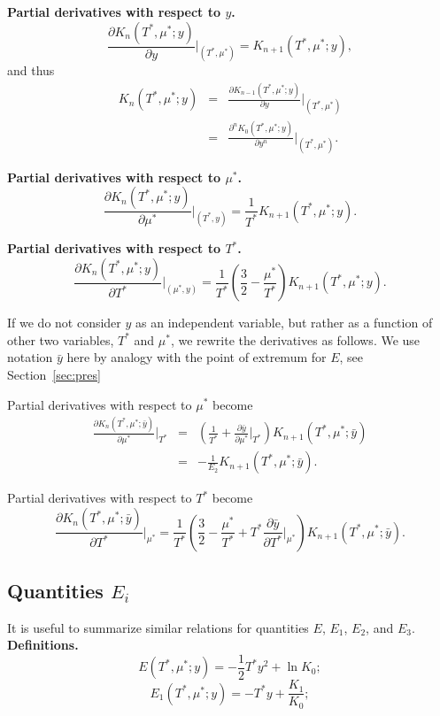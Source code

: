 \documentclass[12pt]{article}
\numberwithin{equation}{section}
\begin{document}
	\textbf{Partial derivatives with respect to $y$.} 
	\begin{equation}
		\frac{\partial K_n(T^*,\mu^*;y)}{\partial y}\bigg|_{(T^*,\mu^*)} = K_{n+1}(T^*,\mu^*;y),
	\end{equation}
	and thus
	\begin{eqnarray}
		K_n(T^*,\mu^*;y) & = & \frac{\partial K_{n-1}(T^*,\mu^*;y)}{\partial y} \bigg|_{(T^*,\mu^*)}
		\nonumber\\
		& = & \frac{\partial^n K_{0}(T^*,\mu^*;y)}{\partial y^n} \bigg|_{(T^*,\mu^*)}.
	\end{eqnarray}
	
	\textbf{Partial derivatives with respect to $\mu^*$.}
	\begin{equation}
		\frac{\partial K_n(T^*,\mu^*;y)}{\partial \mu^*} \bigg|_{(T^*,y)} = \frac{1}{T^*} K_{n+1}(T^*,\mu^*;y).
	\end{equation}
	
	\textbf{Partial derivatives with respect to $T^*$.}
	\begin{equation}
		\frac{\partial K_n(T^*,\mu^*;y)}{\partial T^*} \bigg|_{(\mu^*,y)} = \frac{1}{T^*} \left(\frac{3}{2} - \frac{\mu^*}{T^*}\right) K_{n+1}(T^*,\mu^*;y).
	\end{equation}
	
	If we do not consider $y$ as an independent variable, but rather as a function of other two variables, $T^*$ and $\mu^*$, we rewrite the derivatives as follows. We use notation $\bar{y}$ here by analogy with the point of extremum for $E$, see Section~\ref{sec:pres}
	
	Partial derivatives with respect to $\mu^*$ become
	\begin{eqnarray}
		\frac{\partial K_n(T^*,\mu^*;\bar{y})}{\partial \mu^*} \bigg|_{T^*} & = & \left(\frac{1}{T^*} + \frac{\partial \bar{y}}{\partial \mu^*}\bigg|_{T^*} \right)K_{n+1}(T^*,\mu^*;\bar{y})
		\nonumber\\
		& = & 
		-\frac{1}{E_2} K_{n+1}(T^*,\mu^*;\bar{y}).
	\end{eqnarray}
	
	Partial derivatives with respect to $T^*$ become
		\begin{equation}
		\frac{\partial K_n(T^*,\mu^*;\bar{y})}{\partial T^*} \bigg|_{\mu^*} = \frac{1}{T^*} \left(\frac{3}{2} - \frac{\mu^*}{T^*} + T^* \frac{\partial \bar{y}}{\partial T^*}\bigg|_{\mu^*}\right) K_{n+1}(T^*,\mu^*;\bar{y}).
	\end{equation}
	
	\subsection{Quantities $E_i$}
	It is useful to summarize similar relations for quantities $E$, $E_1$, $E_2$, and $E_3$.
	\linebreak
	\textbf{Definitions.}
	\begin{equation}
		E(T^*,\mu^*;y) = -\frac12T^*y^2 + \ln K_0;
	\end{equation}
	\begin{equation}
		E_1(T^*,\mu^*;y) = -T^* y + \frac{K_1}{K_0};
	\end{equation}
	
\end{document}
